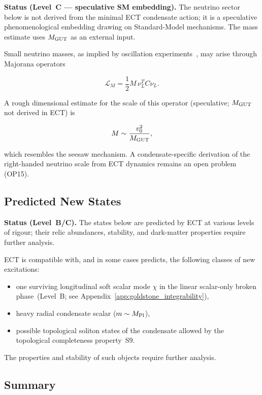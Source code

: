 \documentclass[11pt,a4paper]{article}
\numberwithin{equation}{section}
\begin{document}
\textbf{Status (Level~C — speculative SM embedding).}
The neutrino sector below is not derived from the minimal ECT
condensate action; it is a speculative phenomenological embedding
drawing on Standard-Model mechanisms.  The mass estimate uses
$M_{\rm GUT}$ as an external input.

Small neutrino masses, as implied by oscillation experiments~\cite{Fukuda1998},
may arise through Majorana operators

\begin{equation}
\mathcal{L}_M =
\frac12 M\, \nu_L^T C \nu_L .
\end{equation}

A rough dimensional estimate for the scale of this operator
(speculative; $M_{\rm GUT}$ not derived in ECT) is

\begin{equation}
M \sim \frac{v_0^2}{M_{\rm GUT}},
\end{equation}

which resembles the seesaw mechanism.  A condensate-specific
derivation of the right-handed neutrino scale from ECT dynamics
remains an open problem (OP15).

\subsection{Predicted New States}
\label{sec:instantons}

\textbf{Status (Level~B/C).}  The states below are predicted by
ECT at various levels of rigour; their relic abundances, stability,
and dark-matter properties require further analysis.

ECT is compatible with, and in some cases predicts, the following
classes of new excitations:

\begin{itemize}
\item one surviving longitudinal soft scalar mode $\chi$ in the
  linear scalar-only broken phase~(Level~B;
  see Appendix~\ref{app:goldstone_integrability}),
\item heavy radial condensate scalar ($m\sim M_{\rm Pl}$),
\item possible topological soliton states of the condensate
  allowed by the topological completeness property~S9.
\end{itemize}

The properties and stability of such objects require further analysis.

\subsection{Summary}
\end{document}
